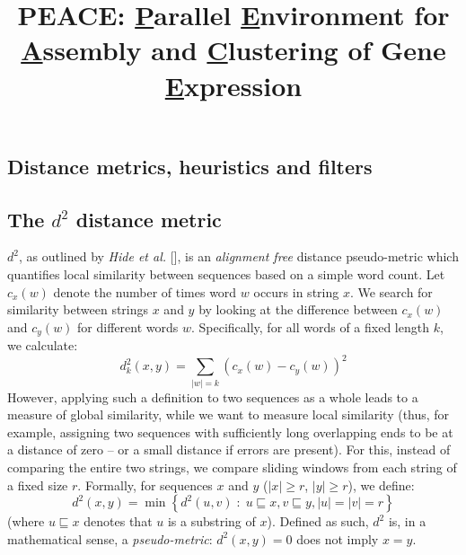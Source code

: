 \documentclass[a4paper,12pt]{article}
\begin{document}
\title{PEACE: {\underline P}arallel {\underline E}nvironment for {\underline A}ssembly
  and {\underline C}lustering of Gene {\underline E}xpression}

\date{}

\maketitle  

\begin{appendix}

\renewcommand{\theequation}{S\arabic{equation}}
\renewcommand{\thefigure}{S\arabic{figure}}
\renewcommand{\thetable}{S\arabic{table}}
\setcounter{equation}{0}

\section{Distance metrics, heuristics and filters}

\subsection{The $d^2$ distance metric}
$d^2$, as outlined by {\it Hide et al.} [\cite{Hide94}], is an {\it
  alignment free} distance pseudo-metric which quantifies local
similarity between sequences based on a simple word count.  Let
$c_x(w)$ denote the number of times word $w$ occurs in string $x$.  We
search for similarity between strings $x$ and $y$ by looking at the
difference between $c_x(w)$ and $c_y(w)$ for different words $w$.
Specifically,  for all words of a fixed length $k$, we calculate:
\begin{equation*}
d^2_k(x,y) = \sum_{|w|=k}(c_x(w) - c_y(w))^2
\end{equation*}
However, applying such a definition to two sequences as a whole leads
to a measure of global similarity, while we want to measure local
similarity (thus, for example, assigning two sequences with
sufficiently long overlapping ends to be at a distance of zero -- or a
small distance if errors are present).  For this, instead of comparing
the entire two strings, we compare sliding windows from each string of a fixed
size $r$.  Formally, for sequences $x$ and $y$ ($|x| \geq r$, $|y|
\geq r$), we define:
\begin{equation}
\label{d2def}
d^2(x,y) = 
\min\left\{d^2(u,v) \; : \; u \sqsubseteq x, v \sqsubseteq y, |u|=|v|=r\right\}
\end{equation}
(where $u \sqsubseteq x$ denotes that $u$ is a substring of $x$).
Defined as such, $d^2$ is, in a mathematical sense, a {\it
  pseudo-metric}: $d^2(x,y) = 0$ does not imply $x=y$.


\end{appendix}
\end{document}

